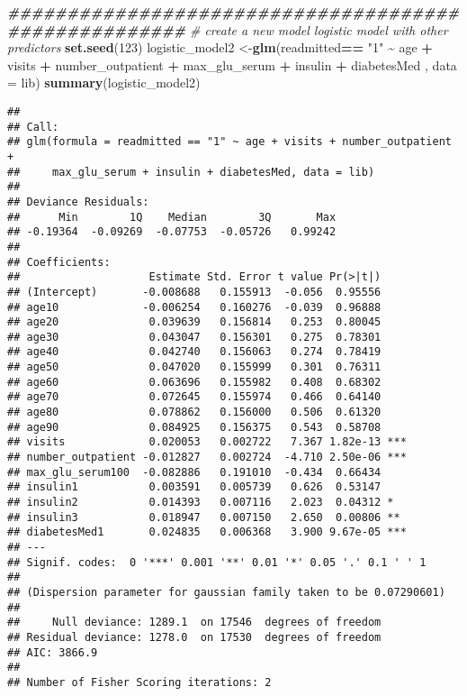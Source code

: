 \documentclass[
]{article}
\newenvironment{Shaded}{\begin{snugshade}}{\end{snugshade}}
\newcommand{\AttributeTok}[1]{\textcolor[rgb]{0.13,0.29,0.53}{#1}}
\newcommand{\CommentTok}[1]{\textcolor[rgb]{0.56,0.35,0.01}{\textit{#1}}}
\newcommand{\DecValTok}[1]{\textcolor[rgb]{0.00,0.00,0.81}{#1}}
\newcommand{\DocumentationTok}[1]{\textcolor[rgb]{0.56,0.35,0.01}{\textbf{\textit{#1}}}}
\newcommand{\FunctionTok}[1]{\textcolor[rgb]{0.13,0.29,0.53}{\textbf{#1}}}
\newcommand{\NormalTok}[1]{#1}
\newcommand{\OtherTok}[1]{\textcolor[rgb]{0.56,0.35,0.01}{#1}}
\newcommand{\SpecialCharTok}[1]{\textcolor[rgb]{0.81,0.36,0.00}{\textbf{#1}}}
\newcommand{\StringTok}[1]{\textcolor[rgb]{0.31,0.60,0.02}{#1}}
\begin{document}
\begin{Shaded}
\begin{Highlighting}[]
\DocumentationTok{\#\#\#\#\#\#\#\#\#\#\#\#\#\#\#\#\#\#\#\#\#\#\#\#\#\#\#\#\#\#\#\#\#\#\#\#\#\#\#\#\#\#\#\#\#\#\#\#\#\#\#\#\#}
\CommentTok{\# create a new model logistic model with other predictors }
\FunctionTok{set.seed}\NormalTok{(}\DecValTok{123}\NormalTok{)}
\NormalTok{logistic\_model2 }\OtherTok{\textless{}{-}}\FunctionTok{glm}\NormalTok{(readmitted}\SpecialCharTok{==} \StringTok{"1"}  \SpecialCharTok{\textasciitilde{}}\NormalTok{ age }\SpecialCharTok{+}\NormalTok{ visits }\SpecialCharTok{+}\NormalTok{ number\_outpatient }\SpecialCharTok{+}\NormalTok{ max\_glu\_serum }\SpecialCharTok{+}\NormalTok{ insulin }\SpecialCharTok{+}\NormalTok{ diabetesMed , }\AttributeTok{data =}\NormalTok{ lib)}
\FunctionTok{summary}\NormalTok{(logistic\_model2)}
\end{Highlighting}
\end{Shaded}

\begin{verbatim}
## 
## Call:
## glm(formula = readmitted == "1" ~ age + visits + number_outpatient + 
##     max_glu_serum + insulin + diabetesMed, data = lib)
## 
## Deviance Residuals: 
##      Min        1Q    Median        3Q       Max  
## -0.19364  -0.09269  -0.07753  -0.05726   0.99242  
## 
## Coefficients:
##                    Estimate Std. Error t value Pr(>|t|)    
## (Intercept)       -0.008688   0.155913  -0.056  0.95556    
## age10             -0.006254   0.160276  -0.039  0.96888    
## age20              0.039639   0.156814   0.253  0.80045    
## age30              0.043047   0.156301   0.275  0.78301    
## age40              0.042740   0.156063   0.274  0.78419    
## age50              0.047020   0.155999   0.301  0.76311    
## age60              0.063696   0.155982   0.408  0.68302    
## age70              0.072645   0.155974   0.466  0.64140    
## age80              0.078862   0.156000   0.506  0.61320    
## age90              0.084925   0.156375   0.543  0.58708    
## visits             0.020053   0.002722   7.367 1.82e-13 ***
## number_outpatient -0.012827   0.002724  -4.710 2.50e-06 ***
## max_glu_serum100  -0.082886   0.191010  -0.434  0.66434    
## insulin1           0.003591   0.005739   0.626  0.53147    
## insulin2           0.014393   0.007116   2.023  0.04312 *  
## insulin3           0.018947   0.007150   2.650  0.00806 ** 
## diabetesMed1       0.024835   0.006368   3.900 9.67e-05 ***
## ---
## Signif. codes:  0 '***' 0.001 '**' 0.01 '*' 0.05 '.' 0.1 ' ' 1
## 
## (Dispersion parameter for gaussian family taken to be 0.07290601)
## 
##     Null deviance: 1289.1  on 17546  degrees of freedom
## Residual deviance: 1278.0  on 17530  degrees of freedom
## AIC: 3866.9
## 
## Number of Fisher Scoring iterations: 2
\end{verbatim}
\end{document}
